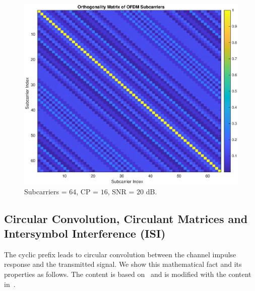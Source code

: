 \begin{figure}[!htbp]
    \centering
    \includegraphics[width=\linewidth]{Orthogonality.eps}
    \caption{Subcarriers = $64$, CP = $16$, SNR = $20$ dB.}
    \label{fig:orthogonality}
\end{figure}

\subsection{Circular Convolution, Circulant Matrices and Intersymbol Interference (ISI)}
The cyclic prefix leads to circular convolution between the channel impulse response and the transmitted signal. We show this mathematical fact and its properties as follows. The content is based on~\cite{91291216} and is modified with the content in~\cite{2024Apr}.

